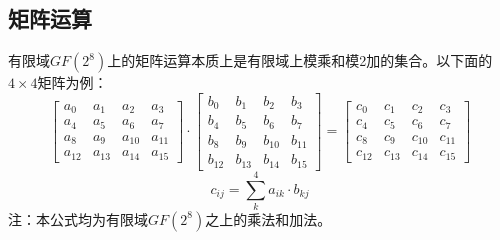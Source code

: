 \documentclass[UTF8]{ctexart}
\begin{document}
\subsection{矩阵运算}
有限域$GF(2^8)$上的矩阵运算本质上是有限域上模乘和模2加的集合。以下面的$4 \times 4$矩阵为例：
\begin{equation}
\begin{bmatrix}
  a_{0} & a_{1} & a_{2} & a_{3} \\
  a_{4} & a_{5} & a_{6} & a_{7} \\
  a_{8} & a_{9} & a_{10}& a_{11} \\
  a_{12}& a_{13}& a_{14}& a_{15}
\end{bmatrix}
\cdot
\begin{bmatrix}
  b_{0} & b_{1} & b_{2} & b_{3} \\
  b_{4} & b_{5} & b_{6} & b_{7} \\
  b_{8} & b_{9} & b_{10}& b_{11} \\
  b_{12}& b_{13}& b_{14}& b_{15}
\end{bmatrix}
=
\begin{bmatrix}
  c_{0} & c_{1} & c_{2} & c_{3} \\
  c_{4} & c_{5} & c_{6} & c_{7} \\
  c_{8} & c_{9} & c_{10}& c_{11} \\
  c_{12}& c_{13}& c_{14}& c_{15}
\end{bmatrix}
\end{equation}
\begin{equation}
c_{ij}= \sum_{k}^{4} a_{ik} \cdot b_{kj}
\end{equation}
注：本公式均为有限域$GF(2^8)$之上的乘法和加法。
\end{document}
